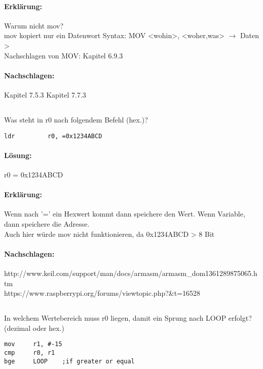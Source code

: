 \paragraph*{Erklärung:}
Warum nicht mov?\\
mov kopiert nur ein Datenwort Syntax: MOV <wohin>, <woher,was> $\rightarrow$ Daten > \\
Nachschlagen von MOV: Kapitel 6.9.3\\
\paragraph*{Nachschlagen:}
Kapitel 7.5.3
Kapitel 7.7.3


\subsection{}
Was steht in r0 nach folgendem Befehl (hex.)?
\begin{lstlisting}
ldr 		r0, =0x1234ABCD
\end{lstlisting}


\paragraph*{Lösung:}
r0 = 0x1234ABCD

\paragraph*{Erklärung:} 
Wenn nach '=' ein Hexwert kommt dann speichere den Wert. Wenn Variable, dann speichere die Adresse.\\
Auch hier würde mov nicht funktionieren, da 0x1234ABCD > 8 Bit\\


\paragraph*{Nachschlagen:}
http://www.keil.com/support/man/docs/armasm/armasm_dom1361289875065.htm\\
https://www.raspberrypi.org/forums/viewtopic.php?&t=16528\\

\subsection{}
In welchem Wertebereich muss r0 liegen, damit ein Sprung nach LOOP erfolgt? (dezimal oder hex.)
\begin{lstlisting}
mov		r1, #-15
cmp		r0, r1
bge		LOOP	;if greater or equal
\end{lstlisting}

